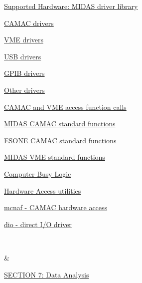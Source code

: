 \begin{TabularC}{2}
\begin{TabularC}{2}
\begin{DoxyItemize}
\begin{DoxyItemize}
\begin{DoxyItemize}
\begin{DoxyItemize}
\begin{DoxyItemize}
\end{DoxyItemize}
\end{DoxyItemize}
\item \hyperlink{FE_Hardware}{Supported Hardware: MIDAS driver library} 
\begin{DoxyItemize}
\item \hyperlink{FE_Hardware_CAMAC_drivers}{CAMAC drivers} 
\item \hyperlink{FE_Hardware_VME_drivers}{VME drivers} 
\item \hyperlink{FE_Hardware_USB_drivers}{USB drivers} 
\item \hyperlink{FE_Hardware_GPIB_drivers}{GPIB drivers} 
\item \hyperlink{FE_Hardware_Other_drivers}{Other drivers} 
\end{DoxyItemize}
\item \hyperlink{FE_camac_vme_function_calls}{CAMAC and VME access function calls} 
\begin{DoxyItemize}
\item \hyperlink{FE_camac_vme_function_calls_FE_Midas_CAMAC_standard_functions}{MIDAS CAMAC standard functions} 
\item \hyperlink{FE_camac_vme_function_calls_FE_ESONE_CAMAC_standard_functions}{ESONE CAMAC standard functions} 
\item \hyperlink{FE_camac_vme_function_calls_FE_Midas_VME_standard_functions}{MIDAS VME standard functions} 
\item \hyperlink{FE_camac_vme_function_calls_FE_Compute_Busy_Logic}{Computer Busy Logic} 
\end{DoxyItemize}
\item \hyperlink{FE_utils}{Hardware Access utilities} 
\begin{DoxyItemize}
\item \hyperlink{FE_utils_FE_mcnaf_utility}{mcnaf -\/ CAMAC hardware access} 
\item \hyperlink{FE_utils_FE_dio_utility}{dio -\/ direct I/O driver} 
\end{DoxyItemize}
\end{DoxyItemize}
\end{DoxyItemize}
\end{DoxyItemize}\\
\par
  &\label{O_Contents_Page_DataAnalysis_section_index}
\hypertarget{O_Contents_Page_DataAnalysis_section_index}{}
 \par
 \hyperlink{DataAnalysis}{SECTION 7: Data Analysis} 
\begin{DoxyItemize}

\end{DoxyItemize}
\end{TabularC}
\end{TabularC}
